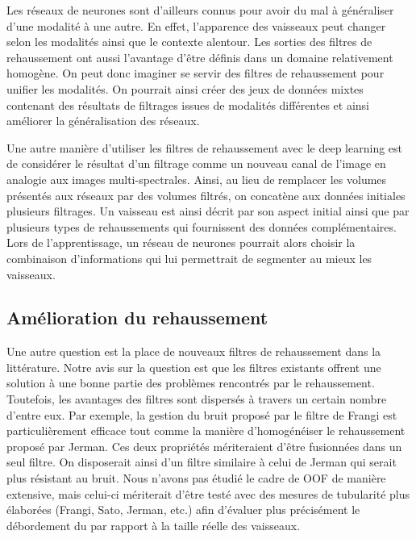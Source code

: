 Les réseaux de neurones sont d'ailleurs connus pour avoir du mal à généraliser d'une modalité à une autre. En effet, l'apparence des vaisseaux peut changer selon les modalités ainsi que le contexte alentour. Les sorties des filtres de rehaussement ont aussi l'avantage d'être définis dans un domaine relativement homogène. On peut donc imaginer se servir des filtres de rehaussement pour unifier les modalités. On pourrait ainsi créer des jeux de données mixtes contenant des résultats de filtrages issues de modalités différentes et ainsi améliorer la généralisation des réseaux.

Une autre manière d'utiliser les filtres de rehaussement avec le deep learning est de considérer le résultat d'un filtrage comme un nouveau canal de l’image en analogie aux images multi-spectrales. Ainsi, au lieu de remplacer les volumes présentés aux réseaux par des volumes filtrés, on concatène aux données initiales plusieurs filtrages. Un vaisseau est ainsi décrit par son aspect initial ainsi que par plusieurs types de rehaussements qui fournissent des données complémentaires. Lors de l'apprentissage, un réseau de neurones pourrait alors choisir la combinaison d'informations qui lui permettrait de segmenter au mieux les vaisseaux.


\subsection{Amélioration du rehaussement}

Une autre question est la place de nouveaux filtres de rehaussement dans la littérature. Notre avis sur la question est que les filtres existants offrent une solution à une bonne partie des problèmes rencontrés par le rehaussement. Toutefois, les avantages des filtres sont dispersés à travers un certain nombre d'entre eux. Par exemple, la gestion du bruit proposé par le filtre de Frangi est particulièrement efficace tout comme la manière d'homogénéiser le rehaussement proposé par Jerman. Ces deux propriétés mériteraient d'être fusionnées dans un seul filtre. On disposerait ainsi d'un filtre similaire à celui de Jerman qui serait plus résistant au bruit. Nous n'avons pas étudié le cadre de OOF de manière extensive, mais celui-ci mériterait d'être testé avec des mesures de tubularité plus élaborées (Frangi, Sato, Jerman, etc.) afin d'évaluer plus précisément le débordement du par rapport à la taille réelle des vaisseaux.

